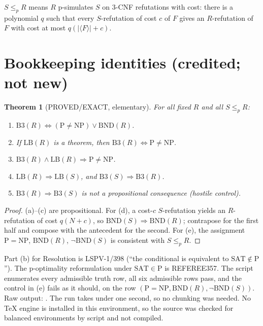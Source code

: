 \documentclass[11pt]{article}
\newtheorem{theorem}{Theorem}
\theoremstyle{definition}
\begin{document}
$S\le_p R$ means $R$ p-simulates $S$ on 3-CNF refutations with cost: there is
a polynomial $q$ such that every $S$-refutation of cost $c$ of $F$ gives an
$R$-refutation of $F$ with cost at most $q(|\langle F\rangle|+c)$.

\section{Bookkeeping identities (credited; not new)}
\begin{theorem}[PROVED/EXACT, elementary]\label{thm:book}
For all fixed $R$ and all $S\le_p R$:
\begin{enumerate}
\item[(a)] $\mathrm{B3}(R)\iff(\mathrm P\ne\mathrm{NP})\lor\mathrm{BND}(R)$.
\item[(b)] If $\mathrm{LB}(R)$ is a theorem, then $\mathrm{B3}(R)\iff\mathrm P\ne\mathrm{NP}$.
\item[(c)] $\mathrm{B3}(R)\land\mathrm{LB}(R)\Rightarrow\mathrm P\ne\mathrm{NP}$.
\item[(d)] $\mathrm{LB}(R)\Rightarrow\mathrm{LB}(S)$, and $\mathrm{B3}(S)\Rightarrow\mathrm{B3}(R)$.
\item[(e)] $\mathrm{B3}(R)\Rightarrow\mathrm{B3}(S)$ is \emph{not} a propositional consequence (hostile control).
\end{enumerate}
\end{theorem}
\begin{proof}
(a)--(c) are propositional. For (d), a cost-$c$ $S$-refutation yields an
$R$-refutation of cost $q(N+c)$, so $\mathrm{BND}(S)\Rightarrow\mathrm{BND}(R)$;
contrapose for the first half and compose with the antecedent for the
second. For (e), the assignment $\mathrm P=\mathrm{NP}$,
$\mathrm{BND}(R)$, $\neg\mathrm{BND}(S)$ is consistent with $S\le_p R$.
\end{proof}
Part (b) for Resolution is LSPV-1/398 (``the conditional is equivalent to
$\mathrm{SAT}\notin\mathrm P$''). The p-optimality reformulation under
$\mathrm{SAT}\in\mathrm P$ is REFEREE357. The script
 enumerates every
admissible truth row, all six admissible rows pass, and the control in (e)
fails as it should, on the row $(\mathrm P{=}\mathrm{NP},\mathrm{BND}(R),\neg\mathrm{BND}(S))$.
Raw output: .
The run takes under one second, so no chunking was needed. No TeX engine is installed in this environment, so the source was checked for balanced environments by script and not compiled.
\end{document}
